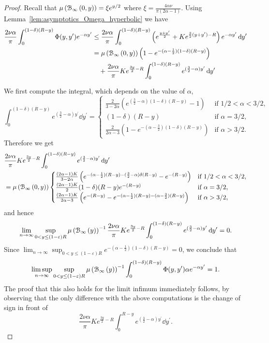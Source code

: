 \begin{proof}
Recall that $\mu\left({\mathcal B}_{\infty}\left(0,y\right)\right) = \xi e^{y/2}$ where $\xi = \frac{4\alpha\nu}{\pi(2\alpha - 1)}$. Using Lemma~\ref{lem:asymptotics_Omega_hyperbolic} we have 
\begin{align*}
	\frac{2\nu \alpha}{\pi} \int_0^{(1-\delta)(R-y)} \Phi(y,y^\prime) e^{-\alpha y^\prime} 
	&\le \frac{2\nu \alpha}{\pi} \int_{0}^{(1-\delta)(R-y)} \left(e^{\frac{y + y^\prime}{2}} + K e^{\frac{3}{2}(y + y^\prime) - R}\right)
		e^{-\alpha y^\prime} \operatorname{\mathrm{d}\hspace{-2pt}} y^\prime\\
	&= \mu\left({\mathcal B}_{\infty}\left(0,y\right)\right)\left(1 - e^{-(\alpha - \frac{1}{2})(1-\delta)(R - y)}\right) \\
	&\hspace{10pt}+ \frac{2\nu \alpha}{\pi} K e^{\frac{3 y}{2} - R}\int_0^{(1-\delta)(R-y)} e^{(\frac{3}{2} - \alpha)y^\prime} \operatorname{\mathrm{d}\hspace{-2pt}} y^\prime
\end{align*}

We first compute the integral, which depends on the value of $\alpha$,
\[
	\int_0^{(1-\delta)(R-y)} e^{(\frac{3}{2} - \alpha)y^\prime} \dd y^\prime
	= \begin{cases}
		\frac{2}{3 - 2\alpha}\left(e^{(\frac{3}{2} - \alpha)(1-\delta)(R-y)} - 1\right) &\mbox{if } 1/2 < \alpha < 3/2,\\
		(1-\delta)(R-y) &\mbox{if } \alpha = 3/2,\\
		\frac{2}{2\alpha-3}\left(1 - e^{-(\alpha - \frac{3}{2})(1-\delta)(R-y)}\right) &\mbox{if } \alpha > 3/2.
	\end{cases}
\]
Therefore we get
\begin{align*}
	&\frac{2\nu \alpha}{\pi} K e^{\frac{3 y}{2} - R}
		\int_0^{(1-\delta)(R-y)} e^{(\frac{3}{2} - \alpha)y^\prime} \operatorname{\mathrm{d}\hspace{-2pt}} y^\prime\\
	&= \mu\left({\mathcal B}_{\infty}\left(0,y\right)\right)\begin{cases}
		\frac{(2\alpha - 1)K}{3 - 2\alpha}\left(e^{-(\alpha - \frac{1}{2})(R - y)-(\frac{3}{2}-\alpha)\delta(R-y)} 
			- e^{-(R - y)}\right)
		&\mbox{if } 1/2 < \alpha < 3/2,\\
		\frac{(2\alpha -1)K}{2} (1-\delta)(R - y)e^{-(R - y)} &\mbox{if } \alpha = 3/2,\\
		\frac{(2\alpha - 1)K}{2\alpha - 3} \left(e^{-(R - y)} - e^{-(\alpha - \frac{1}{2})(R - y) 
			-(\alpha - \frac{3}{2})(R-y)}\right)
		&\mbox{if } \alpha > 3/2,
	\end{cases}
\end{align*}
and hence
\[
	\lim_{n \to \infty} \sup_{0 < y \le (1-\varepsilon)R} \mu\left({\mathcal B}_{\infty}\left(y\right)\right)^{-1}
	\frac{2\nu \alpha}{\pi} K e^{\frac{3 y}{2} - R}
			\int_0^{(1-\delta)(R-y)} e^{(\frac{3}{2} - \alpha)y^\prime} \operatorname{\mathrm{d}\hspace{-2pt}} y^\prime = 0.
\]
Since $\lim_{n \to \infty} \sup_{0 < y \le (1-\varepsilon)R} e^{-(\alpha - \frac{1}{2})(1-\delta)(R - y)} = 0$, we conclude that
\[
	\limsup_{n \to \infty} \sup_{0 < y \le (1-\varepsilon)R} \mu\left({\mathcal B}_{\infty}\left(y\right)\right)^{-1} \int_0^{(1-\delta)(R-y)} \Phi(y,y^\prime)
		\alpha e^{-\alpha y^\prime} = 1.
\]
The proof that this also holds for the limit infimum immediately follows, by observing that the only difference with the above computations is the change of sign in front of 
\[
	\frac{2 \nu \alpha}{\pi} K e^{\frac{3 y}{2} - R}\int_0^{R-y} e^{(\frac{3}{2} - \alpha)y^\prime} \dd y^\prime.
\]
\end{proof}

